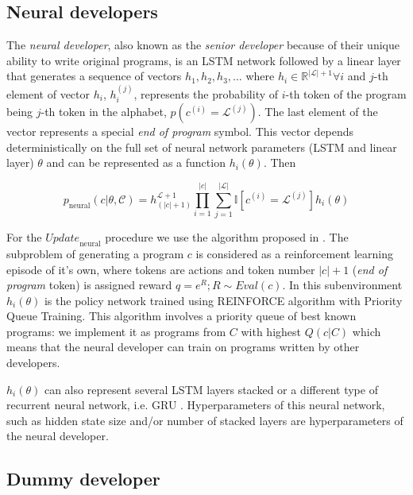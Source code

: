 \newpage \subsection{Neural developers}
\label{sec:neural}

The \emph{neural developer}, also known as the \emph{senior developer} because of their unique ability to write original programs, is an LSTM \cite{hochreiterLongShorttermMemory1997} network followed by a linear layer that generates a sequence of vectors $h_{1},h_{2},h_{3},\dots$ where $h_i \in \mathbb{R}^{|\mathcal{L}| + 1} \forall i$ and $j$-th element of vector $h_i$, $h_i^{(j)}$, represents the probability of $i$-th token of the program being $j$-th token in the alphabet, $p(c^{(i)}=\mathcal{L}^{(j)})$.
The last element of the vector represents a special \emph{end of program} symbol.
This vector depends deterministically on the full set of neural network parameters (LSTM and linear layer) $\theta$ and can be represented as a function $h_i(\theta)$.
Then

\begin{equation}
    p_\text{neural}(c | \theta, \mathcal{C}) = h_{(|c|+1)}^{\mathcal{L}+1}
    \prod\limits_{i=1}^{|c|}
    \sum\limits_{j=1}^{|\mathcal{L}|} \mathbb{I}[c^{(i)}=\mathcal{L}^{(j)}]
    h_i(\theta)
\end{equation}

For the $\mathit{Update}_\text{neural}$ procedure we use the algorithm proposed in \cite{abolafiaNeuralProgramSynthesis2018}.
The subproblem of generating a program $c$ is considered as a reinforcement learning episode of it's own, where tokens are actions and token number $|c|+1$ (\emph{end of program} token) is assigned reward $q = e^R; R \sim Eval(c)$. 
In this subenvironment $h_i(\theta)$ is the policy network \cite[chapter 13]{suttonReinforcementLearningSecond2018} trained using REINFORCE algorithm with Priority Queue Training.
This algorithm involves a priority queue of best known programs: we implement it as programs from $C$ with highest $Q(c|C)$ which means that the neural developer can train on programs written by other developers.

$h_i(\theta)$ can also represent several LSTM layers stacked or a different type of recurrent neural network, i.e. GRU \cite{choPropertiesNeuralMachine2014,chung2014empirical}.
Hyperparameters of this neural network, such as hidden state size and/or number of stacked layers are hyperparameters of the neural developer.  

\newpage \subsection{Dummy developer}

